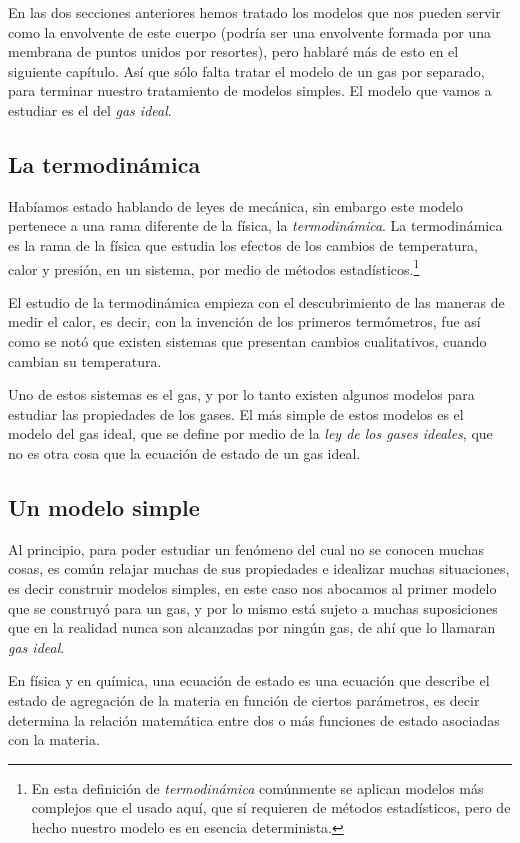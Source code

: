En las dos secciones anteriores hemos tratado los modelos que nos pueden servir como la envolvente de este cuerpo (podría ser una envolvente formada por una membrana de puntos unidos por resortes), pero hablaré más de esto en el siguiente capítulo.
Así que sólo falta tratar el modelo de un gas por separado, para terminar nuestro tratamiento de modelos simples.
El modelo que vamos a estudiar es el del \emph{gas ideal}.

\subsection{La termodinámica}

Habíamos estado hablando de leyes de mecánica, sin embargo este modelo pertenece a una rama diferente de la física, la \emph{termodinámica}.
La termodinámica es la rama de la física que estudia los efectos de los cambios de temperatura, calor y presión, en un sistema, por medio de métodos estadísticos.\footnote{En esta definición de \emph{termodinámica} comúnmente se aplican modelos más complejos que el usado aquí, que sí requieren de métodos estadísticos, pero de hecho nuestro modelo es en esencia determinista.}

El estudio de la termodinámica empieza con el descubrimiento de las maneras de medir el calor, es decir, con la invención de los primeros termómetros, fue así como se notó que existen sistemas que presentan cambios cualitativos, cuando cambian su temperatura.

Uno de estos sistemas es el gas, y por lo tanto existen algunos modelos para estudiar las propiedades de los gases.
El más simple de estos modelos es el modelo del gas ideal, que se define por medio de la \emph{ley de los gases ideales}, que no es otra cosa que la ecuación de estado de un gas ideal.

\subsection{Un modelo simple}

Al principio, para poder estudiar un fenómeno del cual no se conocen muchas cosas, es común relajar muchas de sus propiedades e idealizar muchas situaciones, es decir construir modelos simples, en este caso nos abocamos al primer modelo que se construyó para un gas, y por lo mismo está sujeto a muchas suposiciones que en la realidad nunca son alcanzadas por ningún gas, de ahí que lo llamaran \emph{gas ideal}.

En física y en química, una ecuación de estado es una ecuación que describe el estado de agregación de la materia en función de ciertos parámetros, es decir determina la relación matemática entre dos o más funciones de estado asociadas con la materia.


